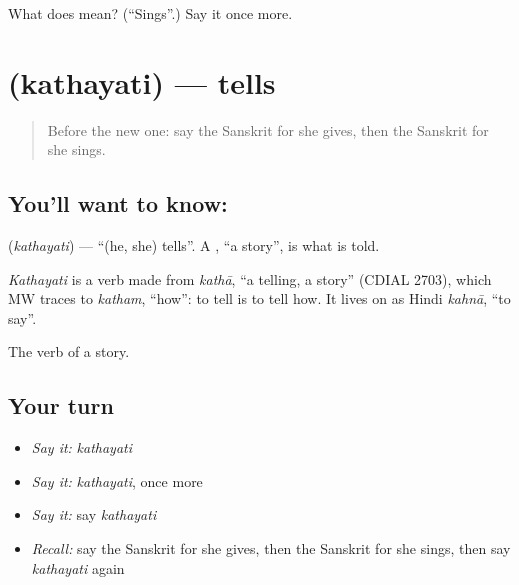 \begin{tcolorbox}[breakable,colback=teal!4,colframe=teal!35!black,title={Before you move on}]
What does  mean? (\textquotedblleft{}Sings\textquotedblright{}.) Say it once more.
\end{tcolorbox}
\section[\texorpdfstring{\sk{कथयति} (kathayati)}{कथयति (kathayati)}]{ (kathayati) — tells}

\label{lesson:SA-C73-tells}



\begin{quote}
Before the new one: say the Sanskrit for she gives, then the Sanskrit for she sings.
\end{quote}

\subsection*{You'll want to know: }
\textbf{} (\emph{kathayati}) — \textquotedblleft{}(he, she) tells\textquotedblright{}. A \textbf{}, \textquotedblleft{}a story\textquotedblright{}, is what is told.

\begin{cousinweb}
\emph{Kathayati} is a verb made from \emph{kathā}, \textquotedblleft{}a telling, a story\textquotedblright{} (CDIAL 2703), which MW traces to \emph{katham}, \textquotedblleft{}how\textquotedblright{}: to tell is to tell how. It lives on as Hindi \emph{kahnā}, \textquotedblleft{}to say\textquotedblright{}.
\end{cousinweb}

\begin{grammarlens}[title={What you've built}]
The verb of a story.
\end{grammarlens}

\subsection*{Your turn}
\begin{itemize}
\raggedright
  \item \emph{Say it:} \emph{kathayati}
  \item \emph{Say it:} \emph{kathayati}, once more
  \item \emph{Say it:} say \emph{kathayati}
  \item \emph{Recall:} say the Sanskrit for she gives, then the Sanskrit for she sings, then say \emph{kathayati} again
\end{itemize}

